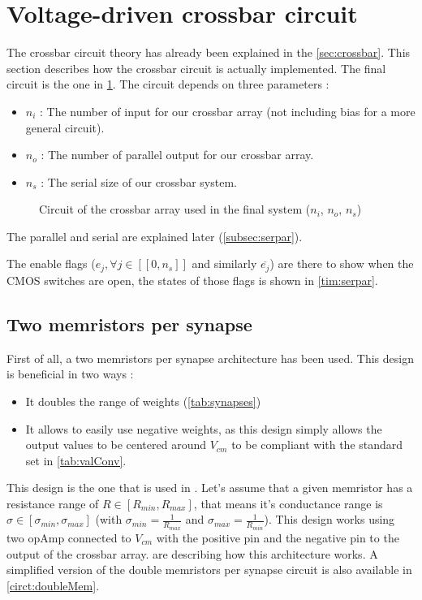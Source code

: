 \section{Voltage-driven crossbar circuit}
\label{sec:xbarCircuit}

The crossbar circuit theory has already been explained in the \cref{sec:crossbar}. This section describes how the crossbar circuit is actually implemented. The final circuit is the one in \cref{circt:xbar}. The circuit depends on three parameters :
\begin{itemize}
  \item $n_i$ : The number of input for our crossbar array (not including bias for a more general circuit).
  \item $n_o$ : The number of parallel output for our crossbar array.
  \item $n_s$ : The serial size of our crossbar system.
\end{itemize}

\begin{figure}[H]
  \centering
  
  \caption{Circuit of the crossbar array used in the final system ($n_i$, $n_o$, $n_s$)}
  \label{circt:xbar}
\end{figure}

The parallel and serial are explained later (\cref{subsec:serpar}).

The enable flags ($e_j,\forall j\in[\![ 0,n_s]\!]$ and similarly $\overline{e_j}$) are there to show when the \ac{CMOS} switches are open, the states of those flags is shown in \cref{tim:serpar}.

\subsection{Two memristors per synapse}
\label{subsec:doubleMem}

First of all, a two memristors per synapse architecture has been used. This design is beneficial in two ways :

\begin{itemize}
  \item It doubles the range of weights (\cref{tab:synapses})
  \item It allows to easily use negative weights, as this design simply allows the output values to be centered around $V_{cm}$ to be compliant with the standard set in \cref{tab:valConv}.
\end{itemize}

This design is the one that is used in \cite{doubleMem}. Let's assume that a given memristor has a resistance range of $R\in[R_{min},R_{max}]$, that means it's conductance range is $\sigma \in [\sigma_{min},\sigma_{max}]$ (with $\sigma_{min}= \frac{1}{R_{max}}$ and $\sigma_{max}= \frac{1}{R_{min}}$). This design works using two \ac{opAmp} connected to $V_{cm}$ with the positive pin and the negative pin to the output of the crossbar array.  are describing how this architecture works. A simplified version of the double memristors per synapse circuit is also available in \cref{circt:doubleMem}.

